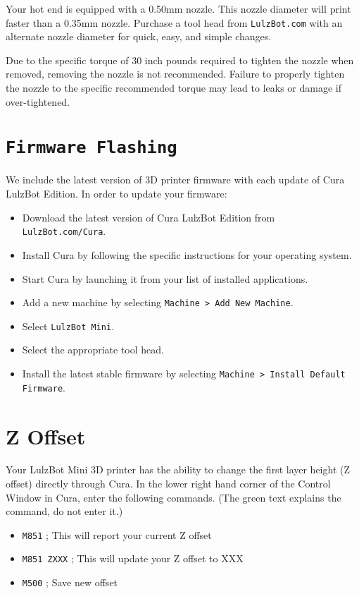 Your hot end is equipped with a 0.50mm nozzle. This nozzle diameter will print faster than a 0.35mm nozzle. Purchase a tool head from \texttt{LulzBot.com} with an alternate nozzle diameter for quick, easy, and simple changes.

Due to the specific torque of 30 inch pounds required to tighten the nozzle when removed, removing the nozzle is not recommended. Failure to properly tighten the nozzle to the specific recommended torque may lead to leaks or damage if over-tightened.


\section{\texttt{Firmware Flashing}}
\label{ssec:num2}
We include the latest version of 3D printer firmware with each update of Cura LulzBot Edition. In order to update your firmware:
\begin{itemize}
\item Download the latest version of Cura LulzBot Edition from \texttt{LulzBot.com/Cura}.
\item Install Cura by following the specific instructions for your operating system. 
\item Start Cura by launching it from your list of installed applications.
\item Add a new machine by selecting \texttt{Machine > Add New Machine}.
\item Select \texttt{LulzBot Mini}.
\item Select the appropriate tool head.
\item Install the latest stable firmware by selecting \texttt{Machine > Install Default Firmware}.
\end{itemize}

\section{Z Offset}
\label{ssec:Z Offset}
Your LulzBot Mini 3D printer has the ability to change the first layer height (Z offset) directly through Cura. In the lower right hand corner of the Control Window in Cura, enter the following commands. (The green text explains the command, do not enter it.)
\begin{itemize}
\item \texttt{M851}                    \textcolor{green2}{; This will report your current Z offset}
\item \texttt{M851 ZXXX}                    \textcolor{green2}{; This will update your Z offset to XXX}
\item \texttt{M500}                    \textcolor{green2}{; Save new offset}
\end{itemize}

